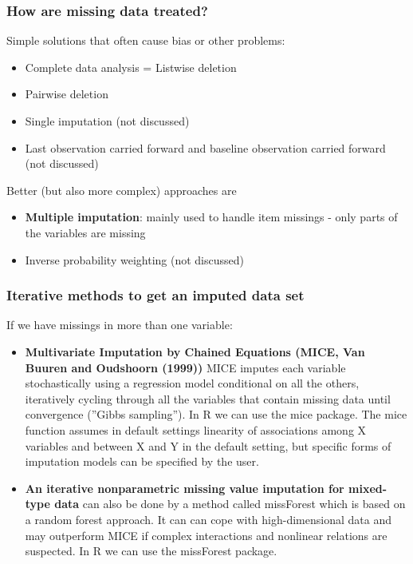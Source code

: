 \documentclass{beamer}\usepackage[]{graphicx}\usepackage[]{color}
\begin{document}
\usebackgroundtemplate{}
\begin{frame}
\frametitle{How are missing data treated?}
Simple solutions that often cause bias or other problems:
\begin{itemize}
\item Complete data analysis = Listwise deletion
\item Pairwise deletion
\item Single imputation (not discussed)
\item Last observation carried forward and baseline observation carried
forward (not discussed)
\end{itemize}
Better (but also more complex) approaches are
\begin{itemize}
\item \textbf{Multiple imputation}: mainly used to handle item missings - only
parts of the variables are missing
\item Inverse probability weighting (not discussed)
\end{itemize}
\end{frame}

\usebackgroundtemplate{}
\begin{frame}
\frametitle{Iterative methods to get an imputed data set}
\small
If we have missings in more than one variable:
\begin{itemize}
\item \textbf{Multivariate Imputation by Chained Equations (MICE, Van Buuren
and Oudshoorn (1999))} \newline
MICE imputes each variable stochastically using a regression model
conditional on all the others, iteratively cycling through all the variables that
contain missing data until convergence (''Gibbs sampling'').
In R we can use the mice package. The mice function assumes in default
settings linearity of associations among X variables and between X and Y in
the default setting, but specific forms of imputation models can be specified by
the user.
\item \textbf{An iterative nonparametric missing value imputation for mixed-type data}
can also be done by a method called missForest which is based on a random
forest approach. It can can cope with high-dimensional data and may
outperform MICE if complex interactions and nonlinear relations are
suspected. In R we can use the missForest package.
\end{itemize}
\end{frame}
\end{document}
